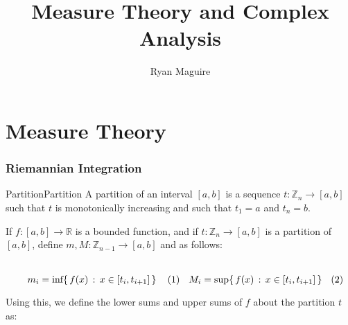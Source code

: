 \documentclass[crop=false,class=article]{standalone}                           %
\begin{document}
    \title{Measure Theory and Complex Analysis}
    \author{Ryan Maguire}
    \date{\vspace{-5ex}}
    \maketitle
    \tableofcontents
    \vspace{10ex}
    \part{Measure Theory}
    \section{Riemannian Integration}
        \begin{fdefinition}{Partition}{Partition}
            A partition of an interval $[a,b]$ is a sequence
            $t:\mathbb{Z}_{n}\rightarrow[a,b]$ such that $t$ is monotonically
            increasing and such that $t_{1}=a$ and $t_{n}=b$.
        \end{fdefinition}
        If $f:[a,b]\rightarrow\mathbb{R}$ is a bounded function, and if
        $t:\mathbb{Z}_{n}\rightarrow[a,b]$ is a partition of $[a,b]$, define
        $m,M:\mathbb{Z}_{n-1}\rightarrow[a,b]$ and as follows:
        \par
        \begin{subequations}
            \begin{minipage}[b]{0.49\textwidth}
                \begin{equation}
                    m_{i}=\textrm{inf}\{\,f(x)\,:\,x\in[t_{i},t_{i+1}]\,\}
                \end{equation}
            \end{minipage}
            \hfill
            \begin{minipage}[b]{0.49\textwidth}
                \begin{equation}
                    M_{i}=\textrm{sup}\{\,f(x)\,:\,x\in[t_{i},t_{i+1}]\,\}
                \end{equation}
            \end{minipage}
        \end{subequations}
        \par\vspace{2.5ex}
        Using this, we define the lower sums and upper sums of $f$ about
        the partition $t$ as:
        \par
\end{document}
